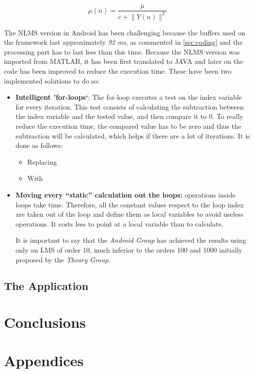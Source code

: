 \documentclass[11pt,a4paper,english]{book}  %
\theoremstyle{definition}  %
\theoremstyle{plain}  %
\theoremstyle{remark}  %
\begin{document}
		
		
	\begin{equation}
	\label{eq:nlms}
		\mu (n)=\frac{\bar{\mu}}{c+\lVert Y(n)\rVert^2}
	\end{equation}
	
	The NLMS version in Android has been challenging because the buffers used on the framework last approximately \textit{92 ms}, as commented in \ref{sec:coding} and the processing part has to last less than this time. Because the NLMS version was imported from MATLAB, it has been first translated to JAVA and later on the code has been improved to reduce the execution time. These have been two implemented solutions to do so:
	
	\begin{itemize}
	\item \textbf{Intelligent 'for-loops`}: The for-loop executes a test on the index variable for every iteration. This test consists of calculating the subtraction between the index variable and the tested value, and then compare it to $0$. To really reduce the execution time, the compared value has to be zero and thus the subtraction will be calculated, which helps if there are a lot of iterations. It is done as follows:
	
		\begin{itemize}
			\item Replacing
			
			\item With
		\end{itemize}
	
	\item \textbf{Moving every “static” calculation out the loops:}  operations inside loops take time. Therefore, all the constant values respect to the loop index are taken out of the loop and define them as local variables to avoid useless operations. It costs less to point at a local variable than to calculate.
	
	It is important to say that the \textit{Android Group} has achieved the results using only an LMS of order 10, much inferior to the orders 100 and 1000 initially proposed by the \textit{Theory Group}.
	\end{itemize}
	
	\section{The Application}

\chapter{Conclusions}

\chapter{Appendices}
\label{sec:appendix}







\end{document}
